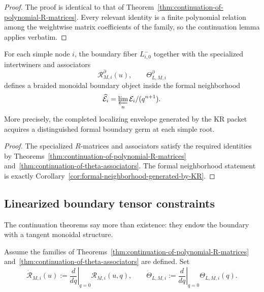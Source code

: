 \begin{proof}
The proof is identical to that of
Theorem~\ref{thm:continuation-of-polynomial-R-matrices}.  Every relevant
identity is a finite polynomial relation among the weightwise matrix
coefficients of the family, so the continuation lemma applies verbatim.
\end{proof}

\begin{corollary}
\ClaimStatusProvedHere
\label{cor:formal-braided-boundary-germ}
For each simple node $i$, the boundary fiber $L^-_{i,0}$ together with the
specialized intertwiners and associators
\begin{equation}
\mathscr R_{M,i}^{\partial}(u),
\qquad
\Theta^{\partial}_{L,M,i}
\end{equation}
defines a braided monoidal boundary object inside the formal neighborhood
\begin{equation}
\widehat{\mathcal E}_i=\varprojlim_n \mathcal E_i/(q^{n+1}).
\end{equation}
More precisely, the completed localizing envelope generated by the KR
packet acquires a distinguished formal boundary germ at each simple root.
\end{corollary}

\begin{proof}
The specialized $R$-matrices and associators satisfy the required
identities by
Theorems~\ref{thm:continuation-of-polynomial-R-matrices}
and~\ref{thm:continuation-of-theta-associators}.  The formal neighborhood
statement is exactly Corollary~\ref{cor:formal-neighborhood-generated-by-KR}.
\end{proof}

\subsection{Linearized boundary tensor constraints}

The continuation theorems say more than existence: they endow the boundary
with a tangent monoidal structure.

\begin{definition}
\label{def:boundary-tangent-tensors}
Assume the families of
Theorems~\ref{thm:continuation-of-polynomial-R-matrices}
and~\ref{thm:continuation-of-theta-associators} are defined.  Set
\begin{equation}
\dot{\mathscr R}_{M,i}(u)
:=
\left.\frac{d}{dq}\right|_{q=0}\mathscr R_{M,i}(u,q),
\qquad
\dot\Theta_{L,M,i}
:=
\left.\frac{d}{dq}\right|_{q=0}\Theta_{L,M,i}(q).
\end{equation}
\end{definition}

